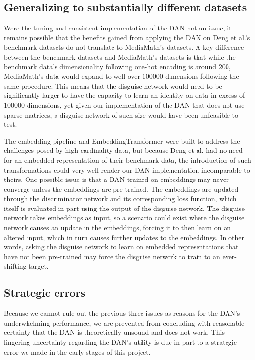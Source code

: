 \documentclass{proc}
\begin{document}
\subsection{Generalizing to substantially different datasets}

Were the tuning and consistent implementation of the DAN not an issue, it remains possible that the benefits gained from applying the DAN on Deng et al.'s benchmark datasets do not translate to MediaMath's datasets. A key difference between the benchmark datasets and MediaMath's datasets is that while the benchmark data's dimensionality following one-hot encoding is around $200$, MediaMath's data would expand to well over $100000$ dimensions following the same procedure. This means that the disguise network would need to be significantly larger to have the capacity to learn an identity on data in excess of $100000$ dimensions, yet given our implementation of the DAN that does not use sparse matrices, a disguise network of such size would have been unfeasible to test.

The embedding pipeline and EmbeddingTransformer were built to address the challenges posed by high-cardinality data, but because Deng et al. had no need for an embedded representation of their benchmark data, the introduction of such transformations could very well render our DAN implementation incomparable to theirs. One possible issue is that a DAN trained on embeddings may never converge unless the embeddings are pre-trained. The embeddings are updated through the discriminator network and its corresponding loss function, which itself is evaluated in part using the output of the disguise network. The disguise network takes embeddings as input, so a scenario could exist where the disguise network causes an update in the embeddings, forcing it to then learn on an altered input, which in turn causes further updates to the embeddings. In other words, asking the disguise network to learn on embedded representations that have not been pre-trained may force the disguise network to train to an ever-shifting target.

\subsection{Strategic errors}

Because we cannot rule out the previous three issues as reasons for the DAN's underwhelming performance, we are prevented from concluding with reasonable certainty that the DAN is theoretically unsound and does not work. This lingering uncertainty regarding the DAN's utility is due in part to a strategic error we made in the early stages of this project.
\end{document}
